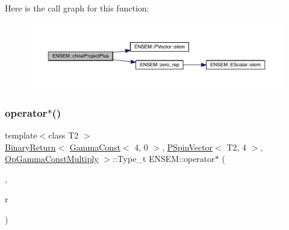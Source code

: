 Here is the call graph for this function\+:\nopagebreak
\begin{figure}[H]
\begin{center}
\leavevmode
\includegraphics[width=350pt]{dd/d6d/group__primspinvector_ga2d58ba66261a878c90b4c5dbc1af1863_cgraph}
\end{center}
\end{figure}
\mbox{\label{group__primspinvector_ga78eeeb22b735ad934f6d55320f04be68}} 
\subsubsection{\texorpdfstring{operator$\ast$()}{operator*()}\hspace{0.1cm}{\footnotesize\ttfamily [1/32]}}
{\footnotesize\ttfamily template$<$class T2 $>$ \\
\mbox{\hyperlink{structENSEM_1_1BinaryReturn}{Binary\+Return}}$<$ \mbox{\hyperlink{classENSEM_1_1GammaConst}{Gamma\+Const}}$<$ 4, 0 $>$, \mbox{\hyperlink{classENSEM_1_1PSpinVector}{P\+Spin\+Vector}}$<$ T2, 4 $>$, \mbox{\hyperlink{structENSEM_1_1OpGammaConstMultiply}{Op\+Gamma\+Const\+Multiply}} $>$\+::Type\+\_\+t E\+N\+S\+E\+M\+::operator$\ast$ (\begin{DoxyParamCaption}\item[{const \mbox{\hyperlink{classENSEM_1_1GammaConst}{Gamma\+Const}}$<$ 4, 0 $>$ \&}]{,  }\item[{const \mbox{\hyperlink{classENSEM_1_1PSpinVector}{P\+Spin\+Vector}}$<$ T2, 4 $>$ \&}]{r }\end{DoxyParamCaption})\hspace{0.3cm}{\ttfamily [inline]}}

\mbox{\label{group__primspinvector_ga78fc0ed12245c6b5e7ab51e07bd4c553}} 

